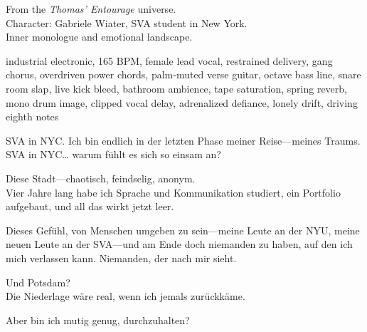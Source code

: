 

\begin{notes}
From the \emph{Thomas’ Entourage} universe.\\
Character: Gabriele Wiater, SVA student in New York.\\
Inner monologue and emotional landscape.
\end{notes}

\begin{style}
industrial electronic, 165 BPM, female lead vocal, restrained delivery, gang chorus, overdriven power chords, palm-muted verse guitar, octave bass line, snare room slap, live kick bleed, bathroom ambience, tape saturation, spring reverb, mono drum image, clipped vocal delay, adrenalized defiance, lonely drift, driving eighth notes
\end{style}

\begin{lyrics}
SVA in NYC. %
Ich bin endlich in der letzten Phase meiner Reise—meines Traums.\\
SVA in NYC… warum fühlt es sich so einsam an?

Diese Stadt—chaotisch, feindselig, anonym.\\
Vier Jahre lang habe ich Sprache und Kommunikation studiert, ein Portfolio aufgebaut, und all das wirkt jetzt leer.

Dieses Gefühl, von Menschen umgeben zu sein—meine Leute an der NYU, meine neuen Leute an der SVA—und am Ende doch niemanden zu haben, auf den ich mich verlassen kann. %
Niemanden, der nach mir sieht.

Und Potsdam?\\
Die Niederlage wäre real, wenn ich jemals zurückkäme.

Aber bin ich mutig genug, durchzuhalten?

\end{lyrics}

